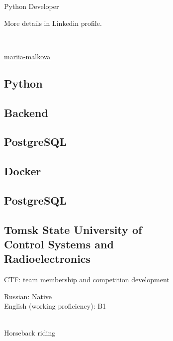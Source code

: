 \documentclass[a4paper]{MagicalCV}
\begin{document}
\lastupdated


\begin{minipage}[t]{0.33\textwidth} 


Python Developer

More details in Linkedin profile.
\sectionsep


\\


\linkedin\underline{{\href{https://www.linkedin.com/in/mariia-malkova-679963214/}{mariia-malkova}}}
\sectionsep


\subsection{Python}
\subsection{Backend}
\subsection{PostgreSQL}
\subsection{Docker}

\subsection{PostgreSQL}


\subsection{Tomsk State University of \\ Control Systems and \\ Radioelectronics}
\vspace{\topsep} %
CTF: team membership and competition development
\sectionsep


Russian: Native\\
English (working proficiency): B1
\sectionsep

\\
Horseback riding
\sectionsep


\end{minipage} 
\end{document}
